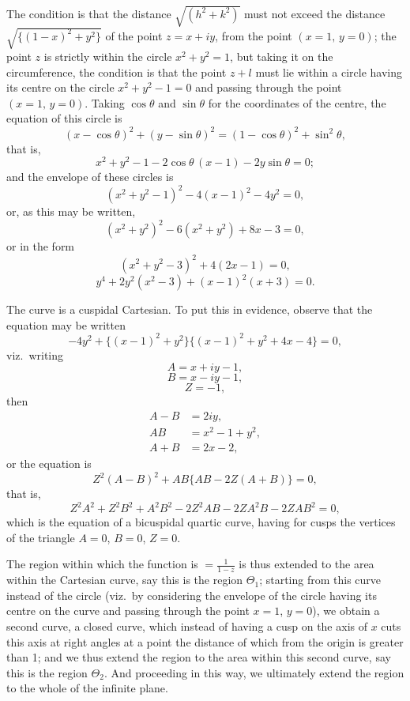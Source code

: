 \documentclass[11pt]{article}
\begin{document}
The condition is that the distance $\sqrt{(h^{2} + k^{2})}$ must not exceed the distance $\sqrt{\{(1 - x)^{2} + y^{2}\}}$ of the point $z = x + iy$, from the point $(x = 1,\,y = 0)$; the point $z$ is strictly within the circle $x^{2} + y^{2} = 1$, but taking it on the circumference, the condition is that the point $z + l$ must lie within a circle having its centre on the circle $x^{2} + y^{2} - 1 = 0$ and passing through the point $(x = 1,\,y = 0)$. Taking $\cos\theta$ and $\sin\theta$ for the coordinates of the centre, the equation of this circle is
\[ (x - \cos\theta)^{2} + (y - \sin\theta)^{2} = (1 - \cos\theta)^{2} + \sin^{2}\theta, \]
that is,
\[ x^{2} + y^{2} - 1 - 2\cos\theta\,(x - 1) - 2y\sin\theta = 0; \]
and the envelope of these circles is
\[ (x^{2} + y^{2} - 1)^{2} - 4(x - 1)^{2} - 4y^{2} = 0, \]
or, as this may be written,
\[ (x^{2} + y^{2})^{2} - 6(x^{2} + y^{2}) + 8x - 3 = 0, \]
or in the form
\[ (x^{2} + y^{2} - 3)^{2} + 4(2x - 1) = 0, \]
\[ y^{4} + 2y^{2}(x^{2} - 3) + (x - 1)^{2}(x + 3) = 0. \]

The curve is a cuspidal Cartesian. To put this in evidence, observe that the equation may be written
\[ -4y^{2} + \{(x - 1)^{2} + y^{2}\}\{(x - 1)^{2} + y^{2} + 4x - 4\} = 0, \]
viz.\ writing
\[ A = x + iy - 1, \]
\[ B = x - iy - 1, \]
\[ Z = -1, \]
then
\begin{align*}
A - B &= 2iy,\\
AB &= x^{2} - 1 + y^{2},\\
A + B &= 2x - 2,
\end{align*}
or the equation is
\[ Z^{2}(A - B)^{2} + AB\{AB - 2Z(A + B)\} = 0, \]
that is,
\[ Z^{2}A^{2} + Z^{2}B^{2} + A^{2}B^{2} - 2Z^{2}AB - 2ZA^{2}B - 2ZAB^{2} = 0, \]
which is the equation of a bicuspidal quartic curve, having for cusps the vertices of the triangle $A = 0$, $B = 0$, $Z = 0$.

The region within which the function is $= \tfrac{1}{1 - z}$ is thus extended to the area within the Cartesian curve, say this is the region $\Theta_{1}$; starting from this curve instead of the circle (viz.\ by considering the envelope of the circle having its centre on the curve and passing through the point $x = 1$, $y = 0$), we obtain a second curve, a closed curve, which instead of having a cusp on the axis of $x$ cuts this axis at right angles at a point the distance of which from the origin is greater than 1; and we thus extend the region to the area within this second curve, say this is the region $\Theta_{2}$. And proceeding in this way, we ultimately extend the region to the whole of the infinite plane.
\end{document}
